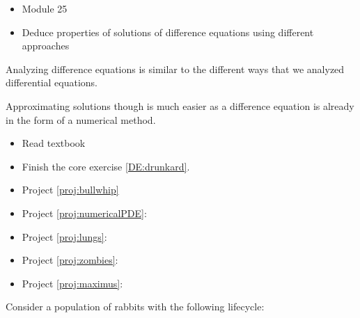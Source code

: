 \begin{lesson}




	\begin{itemize}
		\item Module 25
	\end{itemize}

	\begin{itemize}
		\item Deduce properties of solutions of difference equations using different approaches
	\end{itemize}
	


Analyzing difference equations is similar to the different ways that we analyzed differential equations.

Approximating solutions though is much easier as a difference equation is already in the form of a numerical method.


\begin{itemize}
	\item Read textbook
	\item Finish the core exercise \ref{DE:drunkard}.
\end{itemize}

\begin{itemize}
	\item Project \ref{proj:bullwhip} \bullwhiptitle
	\item Project \ref{proj:numericalPDE}: \numericalPDEtitle
	\item Project \ref{proj:lungs}:\lungstitle
	\item Project \ref{proj:zombies}: \zombiestitle
	\item Project \ref{proj:maximus}: \maximustitle
\end{itemize}

\end{lesson}


\question \label{rabbitscomplicatedproof}
	Consider a population of rabbits with the following lifecycle:

